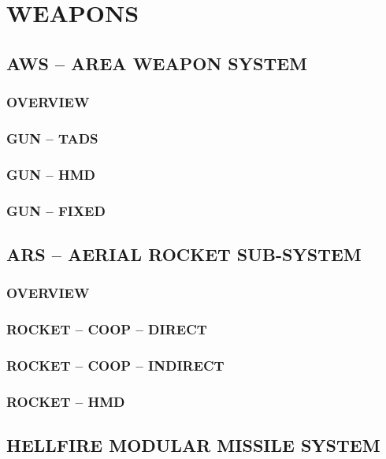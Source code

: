 \documentclass[fontInter]{TechCheck}
\begin{document}
	\cleardoublepage

	\chapter{WEAPONS}
	\minitoc
	\cleardoublepage

	\section{AWS -- AREA WEAPON SYSTEM}
	\subsection{OVERVIEW}
	\subsection{GUN -- TADS}
	\subsection{GUN -- HMD} 
	\subsection{GUN -- FIXED}

	\clearpage 

	\section{ARS -- AERIAL ROCKET SUB-SYSTEM}
	\subsection{OVERVIEW}
	\subsection{ROCKET -- COOP -- DIRECT}
	\subsection{ROCKET -- COOP -- INDIRECT}
	\subsection{ROCKET -- HMD}

	\clearpage

	\section{HELLFIRE MODULAR MISSILE SYSTEM}
\end{document}

